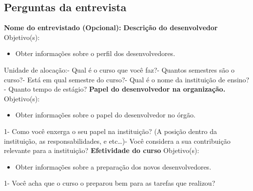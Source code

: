 \begin{anexosenv}

\partanexos

\chapter{Perguntas da entrevista}

\textbf{Nome do entrevistado (Opcional):}\newline\newline
\textbf{Descrição do desenvolvedor}\newline\newline
Objetivo(s):
\begin{itemize}
\item Obter informações sobre o perfil dos desenvolvedores.
\end{itemize}
Unidade de alocação:\newline{}- Qual é o curso que você faz?- Quantos semestres são o curso?- Está em qual semestre do curso?- Qual é o nome da instituição de ensino?- Quanto tempo de estágio?\newline
\newline
\textbf{Papel do desenvolvedor na organização.}\newline\newline
Objetivo(s):
\begin{itemize}
\item Obter informações sobre o papel do desenvolvedor no órgão.
\end{itemize}
1- Como você enxerga o seu papel na instituição? (A posição dentro da instituição, as responsabilidades, e etc…)- Você considera a sua contribuição relevante para a instituição?\newline
    \newline
\textbf{Efetividade do curso}\newline\newline
Objetivo(s):
\begin{itemize}
\item Obter informações sobre a preparação dos novos desenvolvedores.
\end{itemize}
    1- Você acha que o curso o preparou bem para as tarefas que realizou?\newline

\end{anexosenv}
